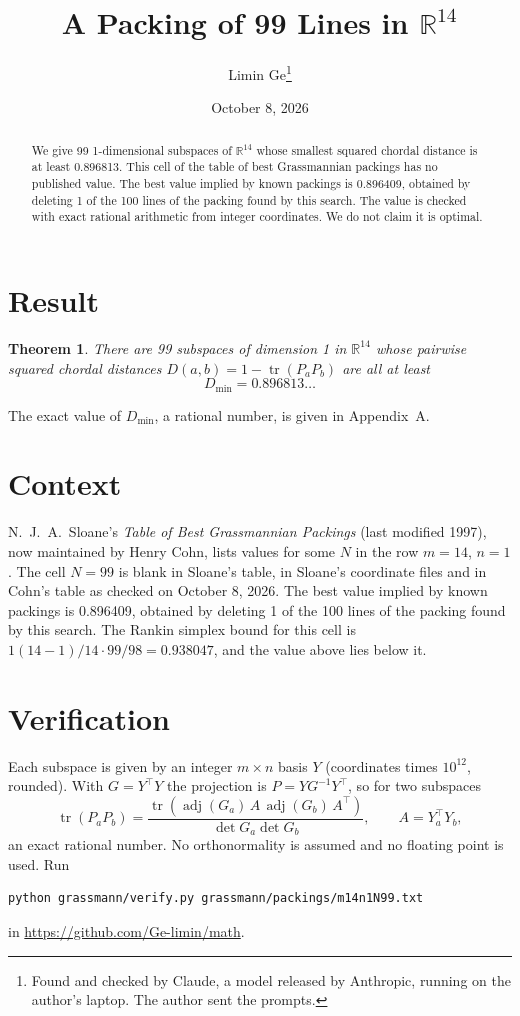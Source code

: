 \documentclass[11pt,a4paper]{article}
\title{A Packing of 99 Lines in $\mathbb{R}^{14}$}
\author{Limin Ge\thanks{Found and checked by Claude, a model released by Anthropic, running on the author's laptop. The author sent the prompts.}}
\date{October 8, 2026}
\newtheorem*{theorem}{Theorem}
\begin{document}
\maketitle
\begin{abstract}
We give 99 1-dimensional subspaces of $\mathbb{R}^{14}$ whose smallest squared chordal distance is at least 0.896813. This cell of the table of best Grassmannian packings has no published value. The best value implied by known packings is 0.896409, obtained by deleting 1 of the 100 lines of the packing found by this search. The value is checked with exact rational arithmetic from integer coordinates. We do not claim it is optimal.
\end{abstract}

\section{Result}
\begin{theorem}
There are 99 subspaces of dimension 1 in $\mathbb{R}^{14}$ whose pairwise squared chordal distances $D(a,b) = 1 - \operatorname{tr}(P_aP_b)$ are all at least
\[ D_{\min} = 0.896813\ldots \]
\end{theorem}
The exact value of $D_{\min}$, a rational number, is given in Appendix~A.


\section{Context}
N.~J.~A.~Sloane's \emph{Table of Best Grassmannian Packings} (last modified 1997), now maintained by Henry Cohn, lists values for some $N$ in the row $m=14$, $n=1$. The cell $N=99$ is blank in Sloane's table, in Sloane's coordinate files and in Cohn's table as checked on October 8, 2026. The best value implied by known packings is 0.896409, obtained by deleting 1 of the 100 lines of the packing found by this search. The Rankin simplex bound for this cell is $1(14-1)/14\cdot 99/98 = 0.938047$, and the value above lies below it.


\section{Verification}
Each subspace is given by an integer $m\times n$ basis $Y$ (coordinates times $10^{12}$, rounded). With $G=Y^\top Y$ the projection is $P=YG^{-1}Y^\top$, so for two subspaces
\[ \operatorname{tr}(P_aP_b)=\frac{\operatorname{tr}(\operatorname{adj}(G_a)\,A\,\operatorname{adj}(G_b)\,A^\top)}{\det G_a\det G_b},\qquad A=Y_a^\top Y_b, \]
an exact rational number. No orthonormality is assumed and no floating point is used. Run
\begin{verbatim}
python grassmann/verify.py grassmann/packings/m14n1N99.txt
\end{verbatim}
in \url{https://github.com/Ge-limin/math}.
\end{document}
